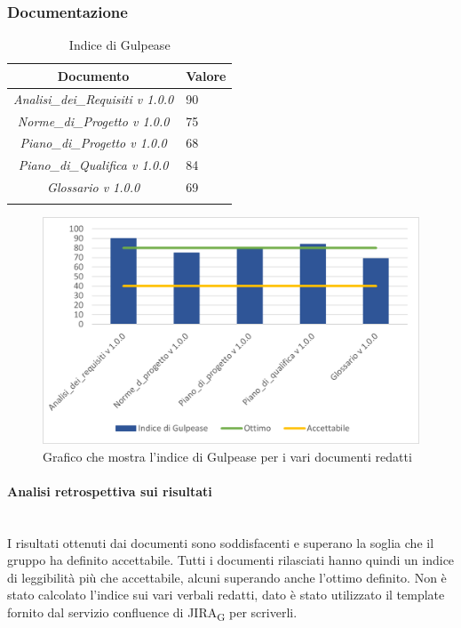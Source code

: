 \subsubsection{Documentazione}
\begin{table}[H]
	\centering
	\setlength\extrarowheight{5pt}
	\renewcommand\tabularxcolumn[1]{>{\Centering}m{#1}}
	\begin{tabularx}{\textwidth}{| c | X |} 
		\hline
		\rowcolor{white}
		\textbf{Documento} & \textbf{Valore}\\
		\hline
		\textit{Analisi\_dei\_Requisiti v 1.0.0} & 90 \\
		\hline
		\textit{Norme\_di\_Progetto v 1.0.0} & 75\\
		\hline
		\textit{Piano\_di\_Progetto v 1.0.0} & 68\\
		\hline
		\textit{Piano\_di\_Qualifica v 1.0.0} & 84\\
		\hline
		\textit{Glossario v 1.0.0} & 69\\
		\hline
		\rowcolor{white}
		\caption{Indice di Gulpease}
	\end{tabularx}
\end{table}
\begin{figure}[H]
	\centering
	\includegraphics[scale=1.1]{img/Gulpease.png}
	\caption{Grafico che mostra l'indice di Gulpease per i vari documenti redatti}
\end{figure}
\paragraph{Analisi retrospettiva sui risultati}\mbox{}\\
I risultati ottenuti dai documenti sono soddisfacenti e superano la soglia che il gruppo ha definito accettabile. Tutti i documenti rilasciati hanno quindi un indice di leggibilità più che accettabile, alcuni superando anche l'ottimo definito. Non è stato calcolato l'indice sui vari verbali redatti, dato è stato utilizzato il template fornito dal servizio confluence di JIRA\textsubscript{G} per scriverli.
